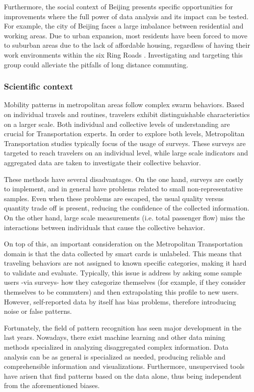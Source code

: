 \documentclass{article}
\begin{document}
Furthermore, the social context of Beijing presents specific opportunities for improvements where the full power of data analysis and its impact can be tested. For example, the city of Beijing faces a large imbalance between residential and working areas. Due to urban expansion, most residents have been forced to move to suburban areas due to the lack of affordable housing, regardless of having their work environments within the six Ring Roads \cite{zhou2014commuting}. Investigating and targeting this group could alleviate the pitfalls of long distance commuting. 


\subsubsection{Scientific context}
Mobility patterns in metropolitan areas follow complex swarm behaviors. Based on individual travels and routines, travelers exhibit distinguishable characteristics on a larger scale. Both individual and collective levels of understanding are crucial for Transportation experts. In order to explore both levels, Metropolitan Transportation studies typically focus of the usage of surveys. These surveys are targeted to reach travelers on an individual level, while large scale indicators and aggregated data are taken to investigate their collective behavior. 

These methods have several disadvantages. On the one hand, surveys are costly to implement, and in general have problems related to small non-representative samples. Even when these problems are escaped, the usual quality versus quantity trade off is present, reducing the confidence of the collected information. On the other hand, large scale measurements (i.e. total passenger flow) miss the interactions between individuals that cause the collective behavior.

On top of this, an important consideration on the Metropolitan Transportation domain is that the data collected by smart cards is unlabeled. This means that traveling behaviors are not assigned to known specific categories, making it hard to validate and evaluate. Typically, this issue is address by asking some sample users -via surveys- how they categorize themselves (for example, if they consider themselves to be commuters) and then extrapolating this profile to new users. However, self-reported data by itself has bias problems, therefore introducing noise or false patterns. 

Fortunately, the field of pattern recognition has seen major development in the last years. Nowadays, there exist machine learning and other data mining methods specialized in analyzing disaggregated complex information. Data analysis can be as general is specialized as needed, producing reliable and comprehensible information and visualizations. Furthermore, unsupervised tools have arisen that find patterns based on the data alone, thus being independent from the aforementioned biases.
\end{document}
